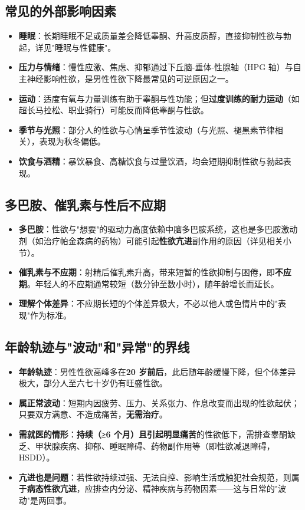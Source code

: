 \subsection{常见的外部影响因素}

\begin{itemize}
	\item \textbf{睡眠}：长期睡眠不足或质量差会降低睾酮、升高皮质醇，直接抑制性欲与勃起，详见"睡眠与性健康"。
	\item \textbf{压力与情绪}：慢性应激、焦虑、抑郁通过下丘脑-垂体-性腺轴（HPG 轴）与自主神经影响性欲，是男性性欲下降最常见的可逆原因之一。
	\item \textbf{运动}：适度有氧与力量训练有助于睾酮与性功能；但\textbf{过度训练的耐力运动}（如超长马拉松、职业骑行）可能反而降低睾酮与性欲。
	\item \textbf{季节与光照}：部分人的性欲与心情呈季节性波动（与光照、褪黑素节律相关），表现为秋冬偏低。
	\item \textbf{饮食与酒精}：暴饮暴食、高糖饮食与过量饮酒，均会短期抑制性欲与勃起表现。
\end{itemize}

\subsection{多巴胺、催乳素与性后不应期}

\begin{itemize}
	\item \textbf{多巴胺}：性欲与"想要"的驱动力高度依赖中脑多巴胺系统，这也是多巴胺激动剂（如治疗帕金森病的药物）可能引起\textbf{性欲亢进}副作用的原因（详见相关小节）。
	\item \textbf{催乳素与不应期}：射精后催乳素升高，带来短暂的性欲抑制与困倦，即\textbf{不应期}。年轻人的不应期通常较短（数分钟至数小时），随年龄增长而延长。
	\item \textbf{理解个体差异}：不应期长短的个体差异极大，不必以他人或色情片中的"表现"作为标准。
\end{itemize}

\subsection{年龄轨迹与"波动"和"异常"的界线}

\begin{itemize}
	\item \textbf{年龄轨迹}：男性性欲高峰多在\textbf{20 岁前后}，此后随年龄缓慢下降，但个体差异极大，部分人至六七十岁仍有旺盛性欲。
	\item \textbf{属正常波动}：短期内因疲劳、压力、关系张力、作息改变而出现的性欲起伏；只要双方满意、不造成痛苦，\textbf{无需治疗}。
	\item \textbf{需就医的情形}：\textbf{持续（≥6 个月）且引起明显痛苦}的性欲低下，需排查睾酮缺乏、甲状腺疾病、抑郁、睡眠障碍、药物副作用等（即性欲减退障碍，HSDD）。
	\item \textbf{亢进也是问题}：若性欲持续过强、无法自控、影响生活或触犯社会规范，则属于\textbf{病态性欲亢进}，应排查内分泌、精神疾病与药物因素——这与日常的"波动"是两回事。
\end{itemize}

